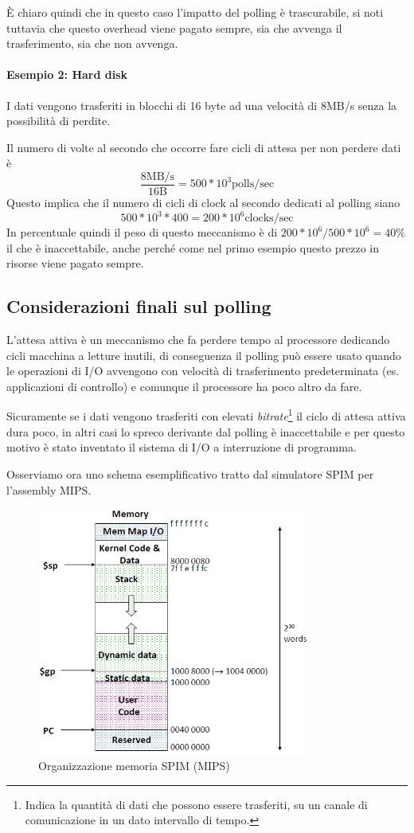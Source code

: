 \documentclass[class=book, crop=false, oneside]{standalone}
\begin{document}
È chiaro quindi che in questo caso l'impatto del polling è trascurabile, si noti tuttavia che questo overhead viene pagato sempre, sia che avvenga il trasferimento, sia che non avvenga.

\paragraph{Esempio 2: Hard disk} I dati vengono trasferiti in blocchi di 16 byte ad una velocità di 8MB/s senza la possibilità di perdite.

Il numero di volte al secondo che occorre fare cicli di attesa per non perdere dati è \[\frac{8\textrm{MB/s}}{16\textrm{B}} = 500*10^{3} \textrm{polls/sec}\]
Questo implica che il numero di cicli di clock al secondo dedicati al polling siano \[ 500*10^{3}*400 = 200*10^{6} \textrm{clocks/sec}\]
In percentuale quindi il peso di questo meccanismo è di \(200*10^{6}/500*10^{6}=40\%\) il che è inaccettabile, anche perché come nel primo esempio questo prezzo in risorse viene pagato sempre.

\subsection{Considerazioni finali sul polling}
L’attesa attiva è un meccanismo che fa perdere tempo al processore dedicando cicli macchina a letture inutili, di conseguenza il polling può essere usato quando le operazioni di I/O avvengono con velocità di trasferimento predeterminata (es. applicazioni di controllo) e comunque il processore ha poco altro da fare.

Sicuramente se i dati vengono trasferiti con elevati \emph{bitrate}\footnote{Indica la quantità di dati che possono essere trasferiti, su un canale di comunicazione in un dato intervallo di tempo.} il ciclo di attesa attiva dura poco, in altri casi lo spreco derivante dal polling è inaccettabile e per questo motivo è stato inventato il sistema di I/O a interruzione di programma.

Osserviamo ora uno schema esemplificativo tratto dal simulatore SPIM per l'assembly MIPS.
\begin{figure}
	\centering
	\includegraphics[width=0.8\textwidth,keepaspectratio]{SPIM}
	\caption{Organizzazione memoria SPIM (MIPS)}
\end{figure}
\end{document}
